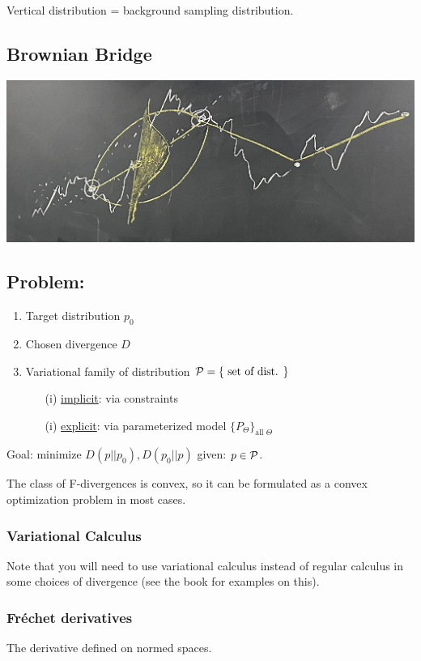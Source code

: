 Vertical distribution = background sampling distribution.

\subsection{Brownian Bridge}
\begin{center}
    \includegraphics[scale=0.25]{lectures/wk8/img/img2.jpeg}
\end{center}

\subsection{Problem:}
\begin{enumerate}
    \item Target distribution $p_0$
    \item Chosen divergence $D$
    \item Variational family of distribution $\mathcal{P} = \{\text{ set of dist. }\}$
    \begin{enumerate}
        \item[(i)] \underline{implicit}: via constraints
        \item[(i)] \underline{explicit}: via parameterized model $\{P_\Theta\}_{\text{all }\Theta}$
    \end{enumerate}
\end{enumerate}
Goal: minimize $D(p||p_0), D(p_0||p)$ given: $p\in\mathcal{P}$. 

The class of F-divergences is convex, so it can be formulated as a convex optimization problem in most cases. 

\subsubsection{Variational Calculus}
Note that you will need to use variational calculus instead of regular calculus in some choices of divergence (see the book for examples on this).

\subsubsection{Fréchet derivatives}
The derivative defined on normed spaces.

